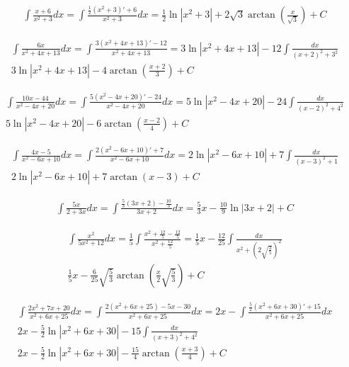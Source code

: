 
\begin{gather*}\int \frac{x+6}{x^2+3}dx = \int \frac{\frac{1}{2}(x^2+3)'+6}{x^2+3}dx=\frac{1}{2}\ln|x^2+3|+2\sqrt{3}\arctan \left( \frac{x}{\sqrt{3}} \right)+C\end{gather*}



\begin{gather*}\int \frac{6x}{x^2+4x+13}dx = \int \frac{3(x^2+4x+13)'-12}{x^2+4x+13} = 3\ln|x^2+4x+13|-12\int \frac{dx}{(x+2)^2+3^2} \\
 3\ln|x^2+4x+13|-4\arctan \left( \frac{x+2}{3} \right)+C\end{gather*}



\begin{gather*}\int \frac{10x-44}{x^2-4x+20}dx = \int \frac{5(x^2-4x+20)'-24}{x^2-4x+20}dx = 5\ln|x^2-4x+20|-24\int \frac{dx}{(x-2)^2+4^2} \\
 5\ln|x^2-4x+20|-6\arctan \left( \frac{x-2}{4} \right)+C\end{gather*}



\begin{gather*}\int \frac{4x-5}{x^2-6x+10}dx = \int \frac{2(x^2-6x+10)'+7}{x^2-6x+10}dx = 2\ln|x^2-6x+10|+7\int \frac{dx}{(x-3)^2+1}\\
2\ln|x^2-6x+10|+7\arctan (x-3)+C\end{gather*}



\begin{gather*}\int \frac{5x}{2+3x}dx = \int \frac{\frac{5}{3}(3x+2)-\frac{10}{3}}{3x+2}dx = \frac{5}{3}x-\frac{10}{9}\ln|3x+2|+C\end{gather*}



\begin{gather*}\int \frac{x^2}{5x^2+12}dx = \frac{1}{5}\int \frac{x^2+\frac{12}{5}-\frac{12}{5}}{x^2+\frac{12}{5}} = \frac{1}{5}x-\frac{12}{25}\int \frac{dx}{x^2+(2\sqrt{\frac{3}{5}})^2} \\
 \frac{1}{5}x-\frac{6}{25}\sqrt{\frac{5}{3}}\arctan \left( \frac{x}{2}\sqrt{\frac{5}{3}}\right)+C\end{gather*}



\begin{gather*}\int \frac{2x^2+7x+20}{x^2+6x+25}dx = \int \frac{2(x^2+6x+25)-5x-30}{x^2+6x+25}dx = 2x - \int \frac{\frac{5}{2}(x^2+6x+30)'+15}{x^2+6x+25}dx \\
 2x -\frac{5}{2}\ln|x^2+6x+30|-15\int \frac{dx}{(x+3)^2+4^2} \\
 2x -\frac{5}{2}\ln|x^2+6x+30|-\frac{15}{4}\arctan \left(\frac{x+3}{4}\right)+C\end{gather*}


